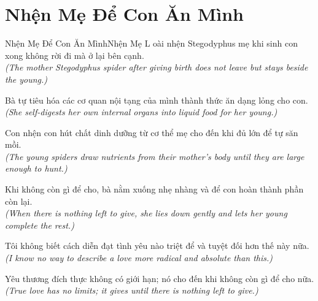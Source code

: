 \section{Nhện Mẹ Để Con Ăn Mình}
\begin{truyen}{Nhện Mẹ Để Con Ăn Mình}{Nhện Mẹ}
L oài nhện Stegodyphus mẹ khi sinh con xong không rời đi mà ở lại bên cạnh.\\
\textit{(The mother Stegodyphus spider after giving birth does not leave but stays beside the young.)}

Bà tự tiêu hóa các cơ quan nội tạng của mình thành thức ăn dạng lỏng cho con.\\
\textit{(She self-digests her own internal organs into liquid food for her young.)}

Con nhện con hút chất dinh dưỡng từ cơ thể mẹ cho đến khi đủ lớn để tự săn mồi.\\
\textit{(The young spiders draw nutrients from their mother's body until they are large enough to hunt.)}

Khi không còn gì để cho, bà nằm xuống nhẹ nhàng và để con hoàn thành phần còn lại.\\
\textit{(When there is nothing left to give, she lies down gently and lets her young complete the rest.)}

Tôi không biết cách diễn đạt tình yêu nào triệt để và tuyệt đối hơn thế này nữa.\\
\textit{(I know no way to describe a love more radical and absolute than this.)}

\end{truyen}
\begin{baihoc}
  Yêu thương đích thực không có giới hạn; nó cho đến khi không còn gì để cho nữa.\\
  \textit{(True love has no limits; it gives until there is nothing left to give.)}
\end{baihoc}

